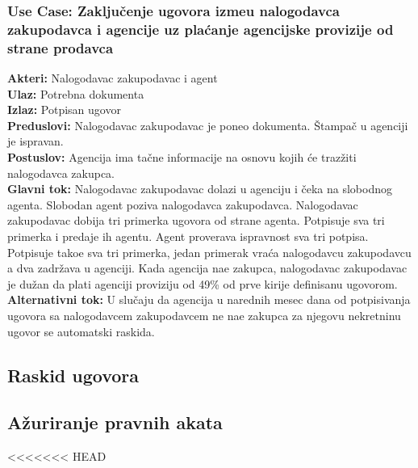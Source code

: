 \documentclass{article}
\begin{document}
\subsubsection{\bfseries Use Case: Zaklju\v {c}enje ugovora izme\dj u nalogodavca zakupodavca i agencije uz pla\' canje agencijske provizije od strane prodavca}
{\bfseries Akteri:} Nalogodavac zakupodavac i agent\\
{\bfseries Ulaz:} Potrebna dokumenta\\
{\bfseries Izlaz:} Potpisan ugovor\\
{\bfseries Preduslovi:} Nalogodavac zakupodavac je poneo dokumenta. \v {S}tampa\v {c} u agenciji je ispravan. \\
{\bfseries Postuslov:} Agencija ima ta\v {c}ne informacije na osnovu kojih \' ce traz\v {z}iti nalogodavca zakupca. \\
{\bfseries Glavni tok:} Nalogodavac zakupodavac dolazi u agenciju i \v {c}eka na slobodnog agenta. Slobodan agent poziva nalogodavca zakupodavca. Nalogodavac zakupodavac dobija tri primerka ugovora od strane agenta. Potpisuje sva tri primerka i predaje ih agentu. Agent proverava ispravnost sva tri potpisa. Potpisuje tako\dj e sva tri primerka, jedan primerak vra\' ca nalogodavcu zakupodavcu a dva zadr\v {z}ava u agenciji. Kada agencija na\dj e zakupca, nalogodavac zakupodavac je du\v {z}an da plati agenciji proviziju od 49\% od prve kirije definisanu ugovorom. \\
{\bfseries Alternativni tok:} U slu\v {c}aju da agencija u narednih mesec dana od potpisivanja ugovora sa nalogodavcem zakupodavcem ne na\dj e zakupca za njegovu nekretninu ugovor se automatski raskida. \\



\newpage
\subsection{\bfseries Raskid ugovora}

\newpage
\subsection{\bfseries A\v{z}uriranje pravnih akata}

<<<<<<< HEAD
\end{document}
